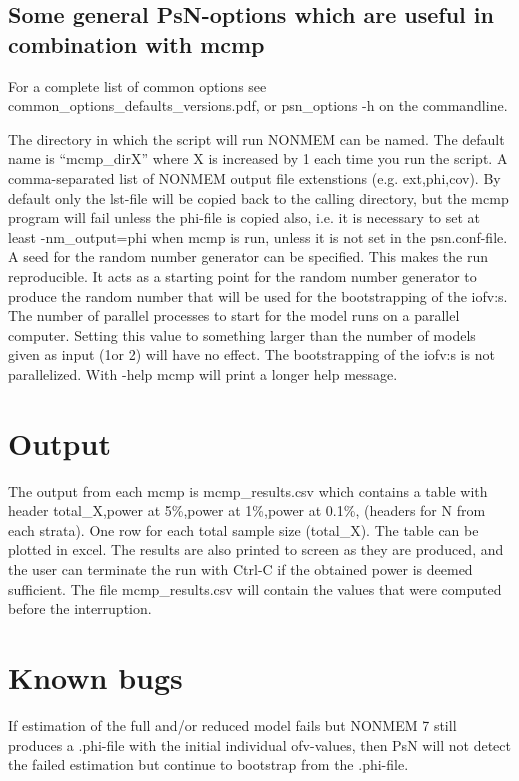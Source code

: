 \subsection{Some general PsN-options which are useful in combination with mcmp}

For a complete list of common options see common\_options\_defaults\_versions.pdf, or psn\_options -h on the commandline.

\begin{optionlist}
The directory in which the script will run NONMEM can be named. The default name is “mcmp\_dirX” where X is increased by 1 each time you run the script. 
\nextopt
{}
A comma-separated list of NONMEM output file extenstions (e.g. ext,phi,cov). By default only the lst-file will be copied back to the calling directory, but the mcmp program will fail unless the phi-file is copied also, i.e. it is necessary to set at least -nm\_output=phi when mcmp is run, unless it is not set in the psn.conf-file.
\nextopt
{}
A seed for the random number generator can be specified. This makes the run reproducible. It acts as a starting point for the random number generator to produce the random number that will be used for the bootstrapping of the iofv:s. 
\nextopt
{}
The number of parallel processes to start for the model runs on a parallel computer. Setting this value to something larger than the number of models given as input (1or 2) will have no effect. The bootstrapping of the iofv:s is not parallelized. 
\nextopt
{}
With -help mcmp will print a longer help message. 
\nextopt
\end{optionlist}

\section{Output}
The output from each mcmp is mcmp\_results.csv which contains a table with header total\_X,power at 5\%,power at 1\%,power at 0.1\%, (headers for N from each strata). One row for each total sample size (total\_X). The table can be plotted in excel. The results are also printed to screen as they are produced, and the user can terminate the run with Ctrl-C if the obtained power is deemed sufficient. The file mcmp\_results.csv will contain the values that were computed before the interruption.

\section{Known bugs}
If estimation of the full and/or reduced model fails but NONMEM 7 still produces a .phi-file with the initial individual ofv-values, then PsN will not detect the failed estimation but continue to bootstrap from the .phi-file.

